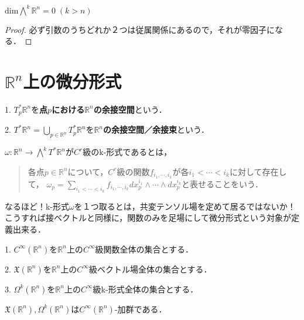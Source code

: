 \documentclass[uplatex, dvipdfmx]{jsreport}
\begin{document}
\begin{proposition}
    $\mathrm{dim}\bigwedge^k\mathbb{R}^n=0\;(k>n)$
\end{proposition}
\begin{proof}
    必ず引数のうちどれか２つは従属関係にあるので，それが零因子になる．
\end{proof}

\begin{theorem}
    
\end{theorem}

\section{$\mathbb{R}^n$上の微分形式}

\begin{definition}
    1. $T^*_p\mathbb{R}^n$を\textbf{点$p$における$\mathbb{R}^n$の余接空間}という．

    2. $T^*\mathbb{R}^n=\bigcup_{p\in\mathbb{R}^n}T^*_p\mathbb{R}^n$を\textbf{$\mathbb{R}^n$の余接空間／余接束}という．
\end{definition}

\begin{definition}[k-form]
    $\omega:\mathbb{R}^n\to\bigwedge^kT^*\mathbb{R}^n$が$C^r$級のk-形式であるとは，
    \begin{quote}
        各点$p\in\mathbb{R}^n$について，$C^r$級の関数$f_{i_1,\cdots,i_k}$が各$i_1<\cdots<i_k$に対して存在して，
        $\omega_p=\sum_{i_1<\cdots<i_k}f_{i_1,\cdots,i_k}dx^{i_1}_p\wedge\cdots\wedge dx^{i_k}_p$と表せることをいう．
    \end{quote}
\end{definition}
\begin{remark}
    なるほど！k-形式$\omega$を１つ取るとは，共変テンソル場を定めて居るではないか！
    こうすれば接ベクトルと同様に，関数のみを足場にして微分形式という対象が定義出来る．
\end{remark}

\begin{definition}[k-form全体の集合]
    1. $C^\infty(\mathbb{R}^n)$を$\mathbb{R}^n$上の$C^\infty$級関数全体の集合とする．

    2. $\mathfrak{X}(\mathbb{R}^n)$を$\mathbb{R}^n$上の$C^\infty$級ベクトル場全体の集合とする．

    3. $\Omega^k(\mathbb{R}^n)$を$\mathbb{R}^n$上の$C^\infty$級k-形式全体の集合とする．

    $\mathfrak{X}(\mathbb{R}^n),\Omega^k(\mathbb{R}^n)$は$C^\infty(\mathbb{R}^n)$-加群である．
\end{definition}
\end{document}
